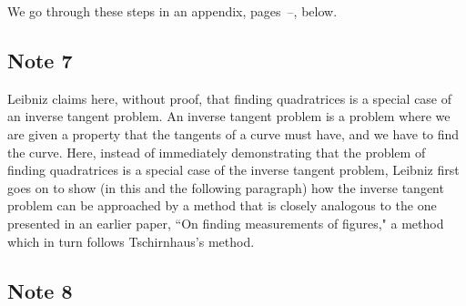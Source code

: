 \documentclass[polutonikogreek,english,twoside,openright]{article}
\begin{document}
We go through these steps in an appendix, pages~\pageref{begapp}--\pageref{endapp}, below.

\subsection*{Note 7}
\label{crg7}

Leibniz claims here, without proof, that finding quadratrices is a
special case of an inverse tangent problem. An inverse tangent problem
is a problem where we are given a property that the tangents of a
curve must have, and we have to find the curve.  Here, instead of
immediately demonstrating that the problem of finding quadratrices is
a special case of the inverse tangent problem, Leibniz first goes on
to show (in this and the following paragraph) how the inverse tangent
problem can be approached by a method that is closely analogous to the
one presented in an earlier paper, ``On finding measurements of
figures," a method which in turn follows Tschirnhaus's method.

\subsection*{Note 8}
\label{crg8}
\end{document}
